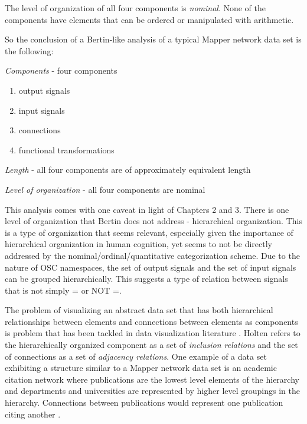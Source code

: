 The level of organization of all four components is \emph{nominal}. None of the components have elements that can be ordered or manipulated with arithmetic.

So the conclusion of a Bertin-like analysis of a typical Mapper network data set is the following:
\begin{description}
\item \emph{Components} - four components
    \begin{enumerate}
        \item output signals
        \item input signals
        \item connections
        \item functional transformations
    \end{enumerate}
\item \emph{Length} - all four components are of approximately equivalent length
\item \emph{Level of organization} - all four components are nominal
\end{description}

This analysis comes with one caveat in light of Chapters 2 and 3. There is one level of organization that Bertin does not address - hierarchical organization. This is a type of organization that seems relevant, especially given the importance of hierarchical organization in human cognition, yet seems to not be directly addressed by the nominal/ordinal/quantitative categorization scheme. Due to the nature of OSC namespaces, the set of output signals and the set of input signals can be grouped hierarchically. This suggests a type of relation between signals that is not simply = or NOT =.

The problem of visualizing an abstract data set that has both hierarchical relationships between elements and connections between elements as components is problem that has been tackled in data visualization literature \cite{edgebundles2006}. Holten refers to the hierarchically organized component as a set of \emph{inclusion relations} and the set of connections as a set of \emph{adjacency relations}. One example of a data set exhibiting a structure similar to a Mapper network data set is an academic citation network where publications are the lowest level elements of the hierarchy and departments and universities are represented by higher level groupings in the hierarchy. Connections between publications would represent one publication citing another \cite{edgebundles2006}.

